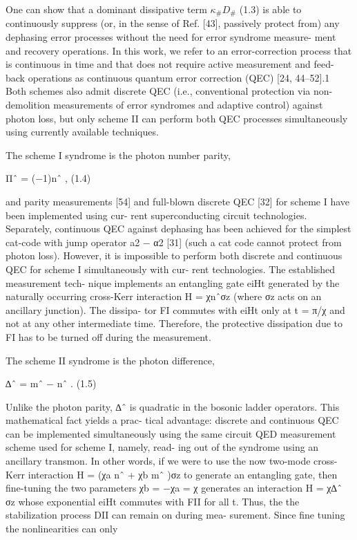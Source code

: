 \documentclass[12]{amsart}
\newcommand\0{\mathbf{0}}
\newcommand\<{\langle}
\renewcommand\>{\rangle}
\begin{document}
One can show that a dominant dissipative term $\kappa_\# D_\#$ (1.3) is able to continuously suppress (or, in the sense of Ref. [43], passively protect from) any dephasing error processes without the need for error syndrome measure- ment and recovery operations. In this work, we refer to an error-correction process that is continuous in time and that does not require active measurement and feed- back operations as continuous quantum error correction (QEC) [24, 44–52].1 Both schemes also admit discrete QEC (i.e., conventional protection via non-demolition measurements of error syndromes and adaptive control) against photon loss, but only scheme II can perform both QEC processes simultaneously using currently available techniques.

The scheme I syndrome is the photon number parity,

Πˆ = (−1)nˆ , (1.4)

and parity measurements [54] and full-blown discrete QEC [32] for scheme I have been implemented using cur- rent superconducting circuit technologies. Separately, continuous QEC against dephasing has been achieved for the simplest cat-code with jump operator a2 − α2 [31] (such a cat code cannot protect from photon loss). However, it is impossible to perform both discrete and continuous QEC for scheme I simultaneously with cur- rent technologies. The established measurement tech- nique implements an entangling gate eiHt generated by the naturally occurring cross-Kerr interaction H = χnˆσz (where σz acts on an ancillary junction). The dissipa- tor FI commutes with eiHt only at t = π/χ and not at any other intermediate time. Therefore, the protective dissipation due to FI has to be turned off during the measurement.

The scheme II syndrome is the photon difference,

∆ˆ = mˆ − nˆ . (1.5)

Unlike the photon parity, ∆ˆ is quadratic in the bosonic ladder operators. This mathematical fact yields a prac- tical advantage: discrete and continuous QEC can be implemented simultaneously using the same circuit QED measurement scheme used for scheme I, namely, read- ing out of the syndrome using an ancillary transmon. In other words, if we were to use the now two-mode cross-Kerr interaction H = (χa nˆ + χb mˆ )σz to generate an entangling gate, then fine-tuning the two parameters χb = −χa = χ generates an interaction H = χ∆ˆ σz whose exponential eiHt commutes with FII for all t. Thus, the the stabilization process DII can remain on during mea- surement. Since fine tuning the nonlinearities can only
\end{document}

